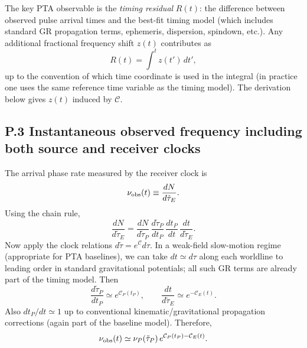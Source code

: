 \documentclass[10pt]{article}
\newcommand{\Eclk}{E}
\begin{document}
The key PTA observable is the \emph{timing residual} $R(t)$: the difference between observed pulse
arrival times and the best-fit timing model (which includes standard GR propagation terms, ephemeris,
dispersion, spindown, etc.). Any additional fractional frequency shift $z(t)$ contributes as
\begin{equation}
R(t)=\int^t z(t')\,dt',
\label{eq:P_residual_def}
\end{equation}
up to the convention of which time coordinate is used in the integral (in practice one uses the same
reference time variable as the timing model). The derivation below gives $z(t)$ induced by $\mathcal{C}$.

\subsection{P.3 Instantaneous observed frequency including both source and receiver clocks}
\label{app:pta:freq_ratio}

The arrival phase rate measured by the receiver clock is
\begin{equation}
\nu_{\rm obs}(t)\equiv \frac{dN}{d\tilde\tau_{\Eclk}}.
\label{eq:P_nuobs_def}
\end{equation}
Using the chain rule,
\begin{equation}
\frac{dN}{d\tilde\tau_{\Eclk}}
=
\frac{dN}{d\tilde\tau_P}\,
\frac{d\tilde\tau_P}{dt_P}\,
\frac{dt_P}{dt}\,
\frac{dt}{d\tilde\tau_{\Eclk}}.
\label{eq:P_chainrule}
\end{equation}
Now apply the clock relations $d\tilde\tau=e^{\mathcal{C}}d\tau$.
In a weak-field slow-motion regime (appropriate for PTA baselines), we can take $dt\simeq d\tau$ along each worldline
to leading order in standard gravitational potentials; all such GR terms are already part of the timing model.
Then
\begin{equation}
\frac{d\tilde\tau_P}{dt_P}\simeq e^{\mathcal{C}_P(t_P)},
\qquad
\frac{dt}{d\tilde\tau_{\Eclk}}\simeq e^{-\mathcal{C}_{\Eclk}(t)}.
\label{eq:P_clock_factors}
\end{equation}
Also $dt_P/dt\simeq 1$ up to conventional kinematic/gravitational propagation corrections (again part of the baseline model).
Therefore,
\begin{equation}
\nu_{\rm obs}(t)
\simeq
\nu_P(\tilde\tau_P)\,
e^{\mathcal{C}_P(t_P)-\mathcal{C}_{\Eclk}(t)}.
\label{eq:P_nuobs_main}
\end{equation}
\end{document}
